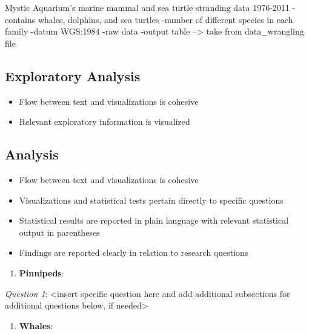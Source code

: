 \documentclass[
  12pt,
]{article}
\providecommand{\tightlist}{%
  \setlength{\itemsep}{0pt}\setlength{\parskip}{0pt}}
\begin{document}
Mystic Aquarium's marine mammal and sea turtle stranding data 1976-2011
-contains whales, dolphins, and sea turtles -number of different species
in each family -datum WGS:1984 -raw data -output table --\textgreater{}
take from data\_wrangling file

\newpage

\hypertarget{exploratory-analysis}{%
\subsection{Exploratory Analysis}\label{exploratory-analysis}}

\begin{itemize}
\tightlist
\item
  Flow between text and visualizations is cohesive
\item
  Relevant exploratory information is visualized
\end{itemize}

\newpage

\hypertarget{analysis}{%
\subsection{Analysis}\label{analysis}}

\begin{itemize}
\tightlist
\item
  Flow between text and visualizations is cohesive
\item
  Visualizations and statistical tests pertain directly to specific
  questions
\item
  Statistical results are reported in plain language with relevant
  statistical output in parentheses
\item
  Findings are reported clearly in relation to research questions
\end{itemize}

\begin{enumerate}
\def\labelenumi{\arabic{enumi}.}
\tightlist
\item
  \textbf{Pinnipeds}:
\end{enumerate}

\emph{Question 1}: \textless insert specific question here and add
additional subsections for additional questions below, if
needed\textgreater{}

\begin{enumerate}
\def\labelenumi{\arabic{enumi}.}
\setcounter{enumi}{1}
\tightlist
\item
  \textbf{Whales}:
\end{enumerate}
\end{document}
